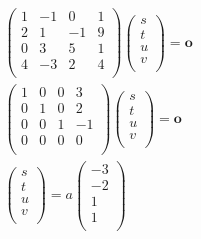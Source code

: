 \documentclass[dvipdfmx,uplatex,11pt]{jsarticle}
\begin{document}
\begin{eqnarray*}
\begin{pmatrix}
1 & -1 & 0 & 1 \\
2 & 1 & -1 & 9 \\
0 & 3 & 5 & 1 \\
4 & -3 & 2 & 4 \\
\end{pmatrix}
\begin{pmatrix}
s \\
t \\
u \\
v \\
\end{pmatrix}
=\bm{o} \\
\begin{pmatrix}
1 & 0 & 0 & 3 \\
0 & 1 & 0 & 2 \\
0 & 0 & 1 & -1 \\
0 & 0 & 0 & 0 \\
\end{pmatrix}
\begin{pmatrix}
s \\
t \\
u \\
v \\
\end{pmatrix}
=\bm{o} \\
\begin{pmatrix}
s \\
t \\
u \\
v \\
\end{pmatrix}
=a
\begin{pmatrix}
-3 \\
-2 \\
1 \\
1 \\
\end{pmatrix}
\end{eqnarray*}
\end{document}
